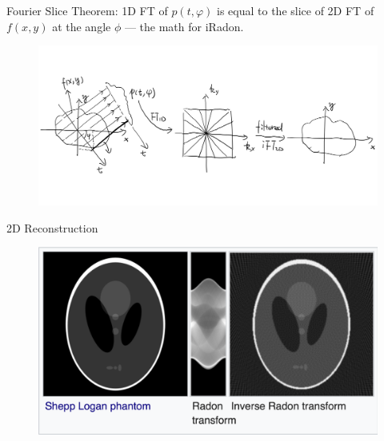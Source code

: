 \documentclass[slidestop,compress,12pt]{beamer}
\begin{document}
\begin{frame}
    Fourier Slice Theorem: 1D FT of $p(t,\varphi)$ is equal to the slice of 2D FT of $f(x,y)$ at the angle $\phi$ --- the math for iRadon.
    \vspace{-0.23cm}
    \begin{figure}
        \includegraphics[scale=0.15]{imgs/iradon.jpg}
    \end{figure}

\end{frame}

\begin{frame}{2D Reconstruction}
    \begin{figure}
        \includegraphics[scale=0.35]{imgs/eg3.png}
    \end{figure}
\end{frame}
\end{document}
